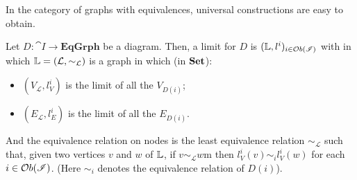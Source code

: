 In the category of graphs with equivalences, universal constructions are easy to obtain. 
\begin{prop}\label{prop:limits_in_EqGrph}
    Let $D: \cat I \rightarrow \mathbf{EqGrph}$ be a diagram. Then, a limit for $D$ is $(\mathbb{L}, l^i)_{i\in \mathcal{O}b(\mathscr{I})}$ with in which $\mathbb{L} = (\mathcal{L}, \sim_{\mathcal{L}})$ is a graph in which (in $\mathbf{Set}$):
    \begin{itemize}
        \item $(V_{\mathcal{L}}, l^i_{V})$ is the limit of all the $V_{D(i)}$;
        \item $(E_{\mathcal{L}}, l^i_{E})$ is the limit of all the $E_{D(i)}$.
    \end{itemize}
    And the equivalence relation on nodes is the least equivalence relation $\sim_{\mathcal{L}}$ such that, given two vertices $v$ and $w$ of $\mathbb{L}$, if $v\sim_{\mathcal{L}}w$m then $l^i_V(v) \sim_i l^i_V(w)$ for each $i\in \mathcal{O}b(\mathscr{I})$. (Here $\sim_i$ denotes the equivalence relation of $D(i)$).
\end{prop}

